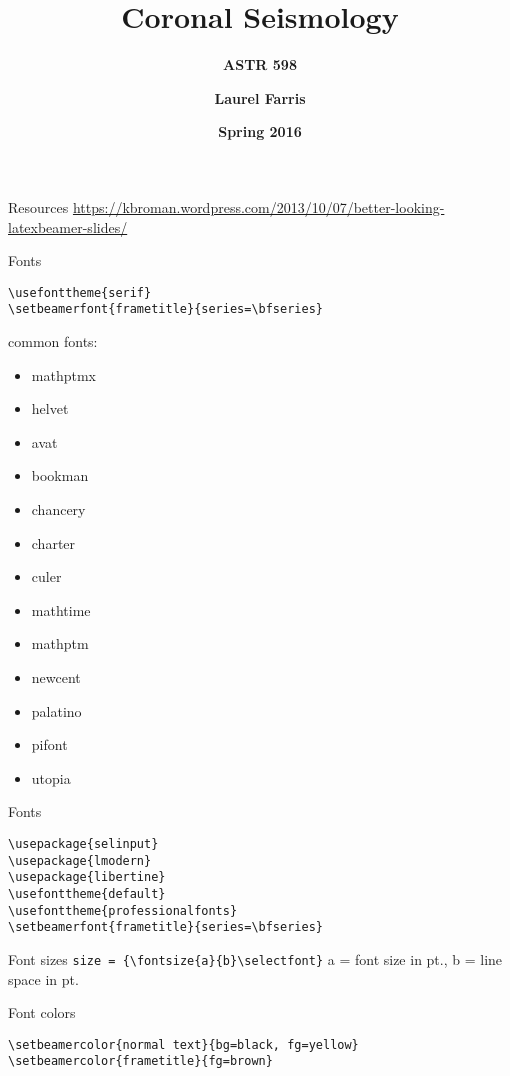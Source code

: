 \documentclass[9pt]{beamer}
\title{\textbf{Coronal Seismology}}
\subtitle{{\bf ASTR 598}}
\date{{\bf Spring 2016}}
\author{\textbf{Laurel Farris}}
\begin{document}
\begin{frame}[fragile=singleslide]{Resources}
    \url{https://kbroman.wordpress.com/2013/10/07/better-looking-latexbeamer-slides/}
\end{frame}%
\begin{frame}[fragile=singleslide]{Fonts}
    \begin{verbatim}
\usefonttheme{serif}
\setbeamerfont{frametitle}{series=\bfseries}
    \end{verbatim}
common fonts:
    \begin{itemize}
        \item mathptmx
        \item helvet
        \item avat
        \item bookman
        \item chancery
        \item charter
        \item culer
        \item mathtime
        \item mathptm
        \item newcent
        \item palatino
        \item pifont
        \item utopia
    \end{itemize}
\end{frame}%
\begin{frame}[fragile=singleslide]{Fonts}
    \begin{verbatim}
\usepackage{selinput}
\usepackage{lmodern}
\usepackage{libertine}
\usefonttheme{default}
\usefonttheme{professionalfonts}
\setbeamerfont{frametitle}{series=\bfseries}
    \end{verbatim}
\end{frame}%
\begin{frame}[fragile=singleslide]{Font sizes}
    \verb|size = {\fontsize{a}{b}\selectfont}|
    a = font size in pt., b = line space in pt.
\end{frame}%
\begin{frame}[fragile=singleslide]{Font colors}
\begin{verbatim}
\setbeamercolor{normal text}{bg=black, fg=yellow}
\setbeamercolor{frametitle}{fg=brown}
\end{verbatim}
\end{frame}%
\end{document}
